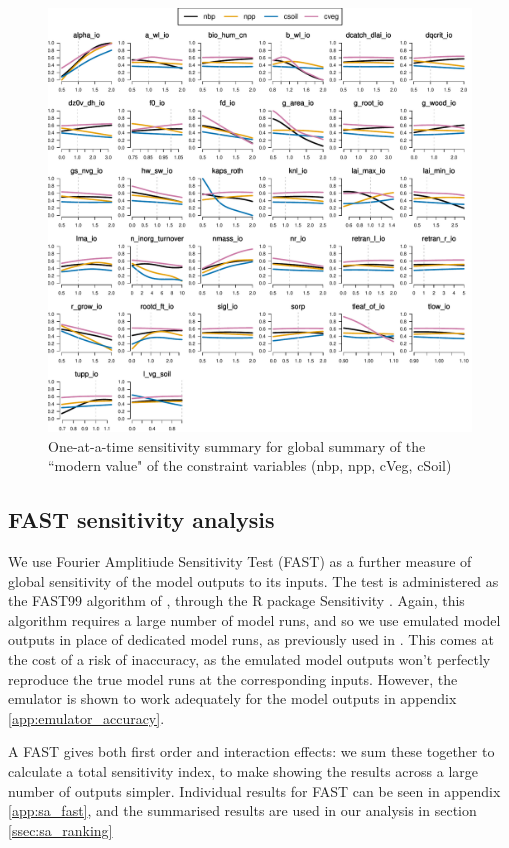 \documentclass[gmd, manuscript]{copernicus}
\begin{document}
\begin{figure}[t]
\includegraphics[width=12cm]{./figs/fig09.pdf}
\caption{One-at-a-time sensitivity summary for global summary of the ``modern value" of the constraint variables (nbp, npp, cVeg, cSoil)}
\label{fig:Y_oaat_const_level1a_wave01_scaled_norm}
\end{figure}

\subsection{FAST sensitivity analysis}\label{ssec:sa_fast}

We use Fourier Amplitiude Sensitivity Test (FAST) as a further measure of global sensitivity of the model outputs to its inputs. The test is administered as the FAST99 algorithm of \cite{saltelli1999sensitivity}, through the R package Sensitivity \citep{Rpackage2015sensitivity}. Again, this algorithm requires a large number of model runs, and so we use emulated model outputs in place of dedicated model runs, as previously used in \cite{mcneall2020correcting, mcneall2016impact, carslaw2013large}. This comes at the cost of a risk of inaccuracy, as the emulated model outputs won't perfectly reproduce the true model runs at the corresponding inputs. However, the emulator is shown to work adequately for the model outputs in appendix \ref{app:emulator_accuracy}. 

A FAST gives both first order and interaction effects: we sum these together to calculate a total sensitivity index, to make showing the results across a large number of outputs simpler. Individual results for FAST can be seen in appendix \ref{app:sa_fast}, and the summarised results are used in our analysis in section \ref{ssec:sa_ranking}
\end{document}
